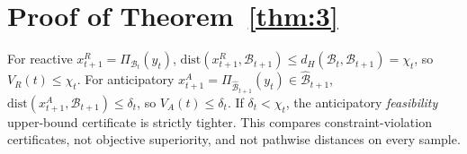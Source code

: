 \section{Proof of Theorem~\ref{thm:3}}
\label{app:thm3}

For reactive $x_{t+1}^{R}=\Pi_{\mathcal{B}_t}(y_t)$,
$\mathrm{dist}(x_{t+1}^{R},\mathcal{B}_{t+1})\le d_H(\mathcal{B}_t,\mathcal{B}_{t+1})=\chi_t$,
so $V_R(t)\le\chi_t$.
For anticipatory $x_{t+1}^{A}=\Pi_{\hat{\mathcal{B}}_{t+1}}(y_t)\in\hat{\mathcal{B}}_{t+1}$,
$\mathrm{dist}(x_{t+1}^{A},\mathcal{B}_{t+1})\le\delta_t$, so $V_A(t)\le\delta_t$.
If $\delta_t<\chi_t$, the anticipatory \emph{feasibility} upper-bound certificate is strictly tighter.
This compares constraint-violation certificates, not objective superiority, and not pathwise distances on every sample.
